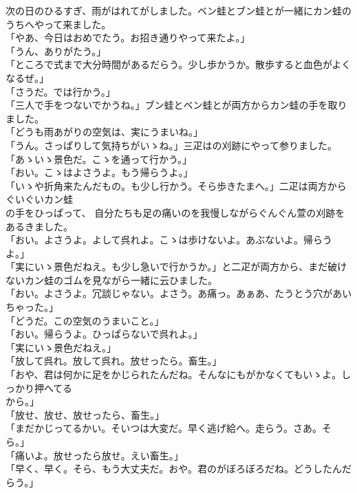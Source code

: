 \documentclass[
a4paper,
10pt,
book]
{tarticle}
\begin{document}
\indent 次の日のひるすぎ、雨がはれてがしました。ベン蛙とブン蛙とが一緒にカン蛙のうちへやって来ました。\\
「やあ、今日はおめでたう。お招き通りやって来たよ。」\\
「うん、ありがたう。」\\
「ところで式まで大分時間があるだらう。少し歩かうか。散歩すると血色がよくなるぜ。」\\
「さうだ。では行かう。」\\
「三人で手をつないでかうね。」ブン蛙とベン蛙とが両方からカン蛙の手を取りました。\\
「どうも雨あがりの空気は、実にうまいね。」\\
「うん。さっぱりして気持ちがいゝね。」三疋はの刈跡にやって参りました。\\
「あゝいゝ景色だ。こゝを通って行かう。」\\
「おい。こゝはよさうよ。もう帰らうよ。」\\
「いゝや折角来たんだもの。も少し行かう。そら歩きたまへ。」二疋は両方からぐいぐいカン蛙\\
\indent の手をひっぱって、
自分たちも足の痛いのを我慢しながらぐんぐん萱の刈跡をあるきました。\\
「おい。よさうよ。よして呉れよ。こゝは歩けないよ。あぶないよ。帰らうよ。」\\
「実にいゝ景色だねえ。も少し急いで行かうか。」と二疋が両方から、まだ破けないカン蛙のゴムを見ながら一緒に云ひました。\\
「おい。よさうよ。冗談じゃない。よさう。あ痛っ。あぁあ、たうとう穴があいちゃった。」\\
「どうだ。この空気のうまいこと。」\\
「おい。帰らうよ。ひっぱらないで呉れよ。」\\
「実にいゝ景色だねえ。」\\
「放して呉れ。放して呉れ。放せったら。畜生。」\\
「おや、君は何かに足をかじられたんだね。そんなにもがかなくてもいゝよ。しっかり押へてる\\
\indent から。」\\
「放せ、放せ、放せったら、畜生。」\\
「まだかじってるかい。そいつは大変だ。早く逃げ給へ。走らう。さあ。そら。」\\
「痛いよ。放せったら放せ。えい畜生。」\\
「早く、早く。そら、もう大丈夫だ。おや。君のがぼろぼろだね。どうしたんだらう。」\\
\end{document}
